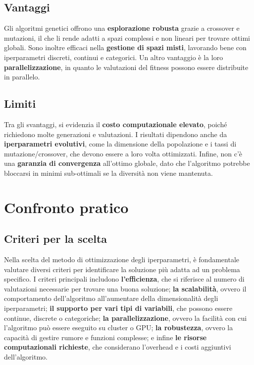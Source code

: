 \documentclass[a4paper,12pt]{report}
\begin{document}
	\subsection{Vantaggi}
	Gli algoritmi genetici offrono una \textbf{esplorazione robusta} grazie a crossover e mutazioni, il che li rende adatti a spazi complessi e non lineari per trovare ottimi globali. Sono inoltre efficaci nella \textbf{gestione di spazi misti}, lavorando bene con iperparametri discreti, continui e categorici. Un altro vantaggio è la loro \textbf{parallelizzazione}, in quanto le valutazioni del fitness possono essere distribuite in parallelo.
	
	\subsection{Limiti}
	Tra gli svantaggi, si evidenzia il \textbf{costo computazionale elevato}, poiché richiedono molte generazioni e valutazioni. I risultati dipendono anche da \textbf{iperparametri evolutivi}, come la dimensione della popolazione e i tassi di mutazione/crossover, che devono essere a loro volta ottimizzati. Infine, non c'è una \textbf{garanzia di convergenza} all'ottimo globale, dato che l'algoritmo potrebbe bloccarsi in minimi sub-ottimali se la diversità non viene mantenuta.
	
	\section{Confronto pratico}
	
	\subsection{Criteri per la scelta}
	Nella scelta del metodo di ottimizzazione degli iperparametri, è fondamentale valutare diversi criteri per identificare la soluzione più adatta ad un problema specifico. I criteri principali includono \textbf{l'efficienza}, che si riferisce al numero di valutazioni necessarie per trovare una buona soluzione; \textbf{la scalabilità}, ovvero il comportamento dell'algoritmo all'aumentare della dimensionalità degli iperparametri; \textbf{il supporto per vari tipi di variabili}, che possono essere continue, discrete o categoriche; \textbf{la parallelizzazione}, ovvero la facilità con cui l'algoritmo può essere eseguito su cluster o GPU; \textbf{la robustezza}, ovvero la capacità di gestire rumore e funzioni complesse; e infine \textbf{le risorse computazionali richieste}, che considerano l'overhead e i costi aggiuntivi dell'algoritmo.
	
\end{document}
